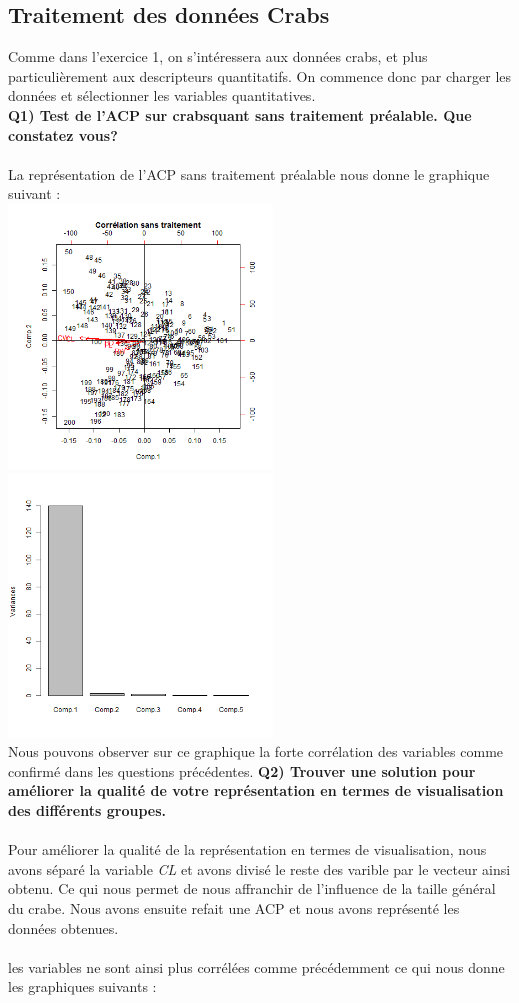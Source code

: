 \documentclass[a4paper, 8pt]{article}
\begin{document}
\subsection{Traitement des donn\'ees Crabs}
Comme dans l’exercice 1, on s’intéressera aux données crabs, et plus particulièrement aux descripteurs quantitatifs. On commence donc par charger les données et sélectionner les variables
quantitatives.\\


\textbf{Q1) Test de l’ACP sur crabsquant sans traitement préalable. Que constatez vous?}\\ \\
La repr\'esentation de l'ACP sans traitement pr\'ealable nous donne le graphique suivant :\\


\includegraphics[height = 7cm, width = 7cm]{plots/biplot_acp2_crabs.png}
\includegraphics[height = 7cm, width = 7cm]{plots/plot_acp2_crabs.png}\\
Nous pouvons observer sur ce graphique la forte corr\'elation des variables comme confirmé dans les questions pr\'ec\'edentes.
\newpage
\textbf{Q2) Trouver une solution pour améliorer la qualité de votre représentation en termes de visualisation des différents groupes.}\\
\\Pour am\'eliorer la qualit\'e de la repr\'esentation en termes de visualisation, nous avons séparé la variable \textit{CL} et avons divisé le reste des varible par le vecteur ainsi obtenu. Ce qui nous permet de nous affranchir de l’influence de la taille général du crabe.
Nous avons ensuite refait une ACP et nous avons repr\'esent\'e les donn\'ees obtenues.\\
 \\ les variables ne sont ainsi plus corr\'el\'ees comme pr\'ec\'edemment ce qui nous donne les graphiques suivants :\\
\end{document}
